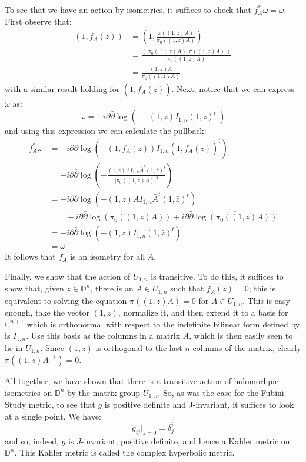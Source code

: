 \documentclass[11pt]{amsart}
\theoremstyle{definition}
\def \C{ \mathbb{C} }
\def \del{ \partial }
\def \delbar{ \bar{\partial} }
\def \disk{ \mathbb{D} }
\begin{document}
To see that we have an action by isometries, it suffices to check that $f_A^{\ast} \omega = \omega$.  First observe that:
%
\begin{align*}
(1, f_A(z) ) &= \left( 1, \frac{ \pi( (1,z)A ) }{ \pi_0 ( (1,z)A ) } \right) \\
&= \frac{ ( \ \pi_0 ( (1,z)A ), \pi ( (1,z)A ) \ ) }{ \pi_0( (1,z)A ) } \\
&= \frac{ (1,z)A }{ \pi_0 ( (1,z)A ) }
\end{align*}
%
with a similar result holding for $( 1, \overline{ f_A (z) } )$.  Next, notice that we can express $\omega$ as:
%
$$ \omega = -i \del \delbar \log( \ - (1,z) I_{1,n} (1, \bar{z})^{t} \ ) $$
%
and using this expression we can calculate the pullback:
%
\begin{align*}
f_A^{\ast} \omega &= - i \del \delbar \log ( - (1, f_A (z) ) I_{1,n} (1, \overline{ f_A (z) } )^{t} ) \\
%
&= -i \del \delbar \log \left( - \frac{ (1,z)A I_{1,n} \bar{A}^{t} (1, \bar{z})^{t} }{ | \pi_0 ( (1,z)A ) |^2 } \right) \\
%
&= - i \del \delbar \log ( - (1,z) A I_{1,n} \bar{A}^t (1, \bar{z})^{t} ) \\
& \quad \quad + i \del \delbar \log(  \pi_0 ( (1,z)A ) )  + i \del \delbar \overline{ \log( \pi_0 ( (1,z)A ) ) } \\
%
&= - i \del \delbar \log ( - (1,z) I_{1,n} (1, \bar{z})^{t} ) \\
%
&= \omega
\end{align*}
%
It follows that $f_A$ is an isometry for all $A$.

Finally, we show that the action of $U_{1,n}$ is transitive.  To do this, it suffices to show that, given $z \in \disk^n$, there is an $A \in U_{1,n}$ such that $f_A (z) = 0$; this is equivalent to solving the equation $\pi( (1,z)A ) = 0$ for $A \in U_{1,n}$.  This is easy enough, take the vector $(1,z)$, normalize it, and then extend it to a basis for $\C^{n+1}$ which is orthonormal with respect to the indefinite bilinear form defined by is $I_{1,n}$.  Use this basis as the columns in a matrix $A$, which is then easily seen to lie in $U_{1,n}$.  Since $(1,z)$ is orthogonal to the last $n$ columns of the matrix, clearly $\pi ( (1,z)A^{-1} ) = 0$.

All together, we have shown that there is a transitive action of holomorhpic isometries on $\disk^n$ by the matrix group $U_{1,n}$.  So, as was the case for the Fubini-Study metric, to see that $g$ is positive definite and J-invariant, it suffices to look at a single point.  We have:
%
$$ g_{ij}|_{z=0} = \delta^i_j$$
%
and so, indeed, $g$ is $J$-invariant, positive definite, and hence a Kahler metric on $\disk^n$.  This Kahler metric is called the complex hyperbolic metric.
\end{document}
